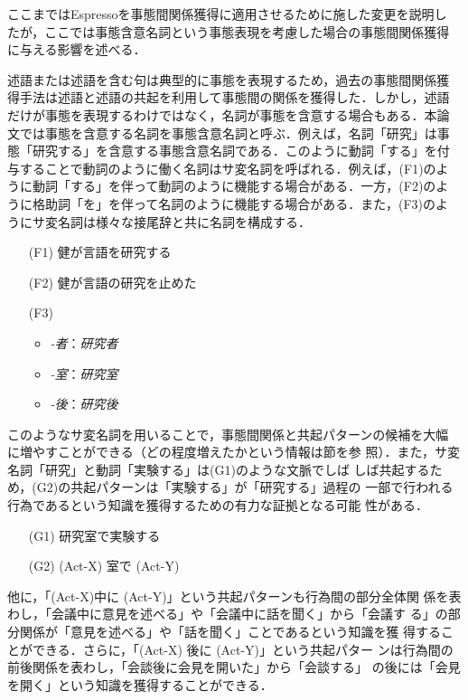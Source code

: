 \documentclass[japanese]{jnlp_1.4}
\begin{document}
ここまではEspressoを事態間関係獲得に適用させるために施した変更を説明し
たが，ここでは事態含意名詞という事態表現を考慮した場合の事態間関係獲得
に与える影響を述べる．

述語または述語を含む句は典型的に事態を表現するため，過去の事態間関係獲
得手法は述語と述語の共起を利用して事態間の関係を獲得した．しかし，述語
だけが事態を表現するわけではなく，名詞が事態を含意する場合もある．本論
文では事態を含意する名詞を事態含意名詞と呼ぶ．例えば，名詞「研究」は事
態「研究する」を含意する事態含意名詞である．このように動詞「する」を付
与することで動詞のように働く名詞はサ変名詞を呼ばれる．例えば，(F1)のよ
うに動詞「する」を伴って動詞のように機能する場合がある．一方，(F2)のよ
うに格助詞「を」を伴って名詞のように機能する場合がある．また，(F3)のよ
うにサ変名詞は様々な接尾辞と共に名詞を構成する．

\begin{itemize}
\item[(F1)] 健が言語を研究する
\item[(F2)] 健が言語の研究を止めた
\item[(F3)]
  \begin{itemize}
  \item \textit{-者}：\textit{研究者}
  \item \textit{-室}：\textit{研究室}
  \item \textit{-後}：\textit{研究後}
  \end{itemize}
\end{itemize}

このようなサ変名詞を用いることで，事態間関係と共起パターンの候補を大幅
に増やすことができる（どの程度増えたかという情報は節を参
照）．また，サ変名詞「研究」と動詞「実験する」は(G1)のような文脈でしば
しば共起するため，(G2)の共起パターンは「実験する」が「研究する」過程の
一部で行われる行為であるという知識を獲得するための有力な証拠となる可能
性がある．
\begin{itemize}
\item[(G1)] 研究室で実験する
\item[(G2)] (Act-X) 室で (Act-Y)
\end{itemize}
他に，「(Act-X)中に (Act-Y)」という共起パターンも行為間の部分全体関
係を表わし，「会議中に意見を述べる」や「会議中に話を聞く」から「会議す
る」の部分関係が「意見を述べる」や「話を聞く」ことであるという知識を獲
得することができる．さらに，「(Act-X) 後に (Act-Y)」という共起パター
ンは行為間の前後関係を表わし，「会談後に会見を開いた」から「会談する」
の後には「会見を開く」という知識を獲得することができる．
\end{document}

